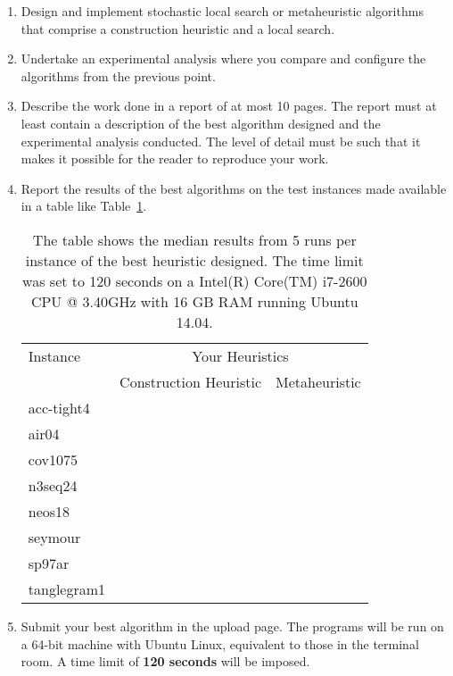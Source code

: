 \begin{enumerate}

\item Design and implement stochastic local search or
  metaheuristic algorithms that comprise a construction heuristic and a
  local search.

\item Undertake an experimental analysis where you compare and
  configure the algorithms from the previous point. 

\item Describe the work done in a report of at most 10 pages. The report
  must at least contain a description of the best algorithm designed and
  the experimental analysis conducted. The level of detail must be such
  that it makes it possible for the reader to reproduce your work.



\item Report the results of the best algorithms on the test instances
  made available in a table like Table~\ref{res}.




\begin{table}[tb]
\begin{center}
\begin{tabular}{|l||r|r|}
  \hline
Instance&
\multicolumn{2}{c|}{Your Heuristics}\\
\cline{2-3}
& Construction Heuristic&Metaheuristic\\
  \hline
acc-tight4&&\\
air04&&\\
cov1075&&\\
n3seq24&&\\
neos18&&\\
seymour&&\\
sp97ar&&\\
tanglegram1&&\\
   \hline
\end{tabular}
\end{center}
\caption{\label{res} The table shows the median results from 5 runs
  per instance of the best heuristic designed. The time limit was set to
  120 seconds on a Intel(R) Core(TM) i7-2600 CPU @ 3.40GHz with 16 GB RAM
  running Ubuntu 14.04.} 
\end{table}


\item Submit your best algorithm in the upload page. The programs will
  be run on a 64-bit machine with Ubuntu Linux, equivalent to those in
  the terminal room. A time limit of \textbf{120 seconds} will be
  imposed.


\end{enumerate}


